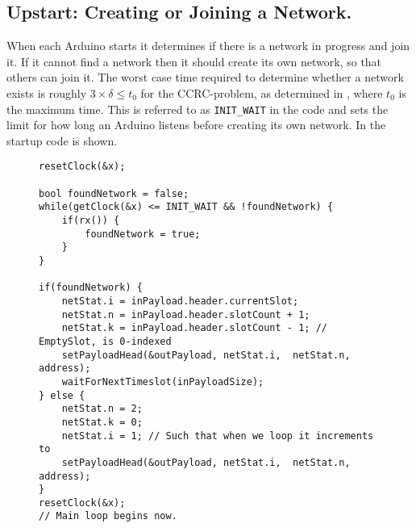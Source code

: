 \subsection{Upstart: Creating or Joining a Network.}
When each Arduino starts it determines if there is a network in progress and join it. 
If it cannot find a network then it should create its own network, so that others can join it. 
The worst case time required to determine whether a network exists is roughly $3 \times \delta \leq t_0$ for the CCRC-problem, as determined in , where $t_0$ is the maximum time. 
This is referred to as \texttt{INIT\_WAIT} in the code and sets the limit for how long an Arduino listens before creating its own network. 
In  the startup code is shown. 
\begin{figure}
\begin{lstlisting}[style=customc,caption={Startup, if a network is found join it, if not create one.},label={lst:ccrc:startup}]
resetClock(&x);

bool foundNetwork = false;
while(getClock(&x) <= INIT_WAIT && !foundNetwork) {
    if(rx()) {
        foundNetwork = true;
    }
}

if(foundNetwork) {
    netStat.i = inPayload.header.currentSlot;
    netStat.n = inPayload.header.slotCount + 1;
    netStat.k = inPayload.header.slotCount - 1; // EmptySlot, is 0-indexed
    setPayloadHead(&outPayload, netStat.i,  netStat.n, address);
    waitForNextTimeslot(inPayloadSize);
} else {
    netStat.n = 2;
    netStat.k = 0;
    netStat.i = 1; // Such that when we loop it increments to
    setPayloadHead(&outPayload, netStat.i,  netStat.n, address);
}
resetClock(&x);
// Main loop begins now.
\end{lstlisting}
\end{figure}
